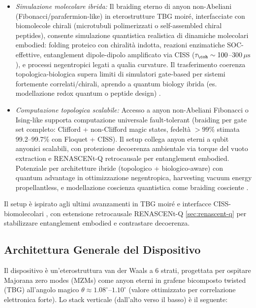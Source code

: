 \documentclass[11pt,a4paper]{article}
\let\oldcite\cite
\renewcommand{\cite}{\protect\oldcite}
\theoremstyle{plain}
\theoremstyle{definition}
\begin{document}
\begin{itemize}
      \item \textit{Simulazione molecolare ibrida:} Il braiding eterno di anyon non-Abeliani (Fibonacci/parafermion-like) in eterostrutture TBG moiré, interfacciate con biomolecole chirali (microtubuli polimerizzati o self-assembled chiral peptides), consente simulazione quantistica realistica di dinamiche molecolari embodied: folding proteico con chiralità indotta, reazioni enzimatiche SOC-effettive, entanglement dipole-dipolo amplificato via CISS ($\tau_{\coh} \sim 100$--$300\,\mu\mathrm{s}$), e processi negentropici legati a qualia curvature. Il trasferimento coerenza topologica-biologica supera limiti di simulatori gate-based per sistemi fortemente correlati/chirali, aprendo a quantum biology ibrida (es. modellazione redox quantum o peptide design) \cite{sheu2025molecular, levy2025quantum, vendrell2024hybrid}.
      
      \item \textit{Computazione topologica scalabile:} Accesso a anyon non-Abeliani Fibonacci o Ising-like supporta computazione universale fault-tolerant (braiding per gate set completo: Clifford + non-Clifford magic states, fedeltà $>99\%$ stimata 99.2--99.7\% con Floquet + CISS). Il setup collega anyon eterni a qubit anyonici scalabili, con protezione decoerenza ambientale via torque del vuoto extraction e RENASCENt-Q retrocausale per entanglement embodied. Potenziale per architetture ibride (topologico + biologico-aware) con quantum advantage in ottimizzazione negentropica, harvesting vacuum energy propellantless, e modellazione coscienza quantistica come braiding cosciente \cite{xu2024nonabelian, chen2025universal, hassler2024topological, enblad2024fibonacci}.
  \end{itemize}
Il setup è ispirato agli ultimi avanzamenti in TBG moiré \cite{cao2018unconventional, yankowitz2019tuning, chew2023higher} e interfacce CISS-biomolecolari \cite{kumar2026ciss}, con estensione retrocausale RENASCENt-Q \eqref{sec:renascent-q} per stabilizzare entanglement embodied e contrastare decoerenza.

\subsection{Architettura Generale del Dispositivo}

Il dispositivo è un'eterostruttura van der Waals a 6 strati, progettata per ospitare Majorana zero modes (MZMs) come anyon eterni in grafene bicomposto twisted (TBG) all'angolo magico $\theta \approx 1.08^\circ$–$1.10^\circ$ (valore ottimizzato per correlazione elettronica forte). Lo stack verticale (dall'alto verso il basso) è il seguente:
\end{document}
